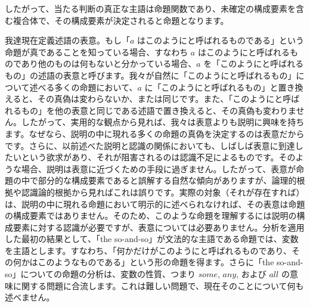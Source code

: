 \documentclass[a4paper,11pt,openany]{ltjsbook}
\begin{document}
したがって、当たる判断の真正な主語は命題関数であり、未確定の構成要素を含む複合体で、その構成要素が決定されると命題となります。

我達現在定義述語の表意。もし「$a$ はこのようにと呼ばれるものである」という命題が真であることを知っている場合、すなわち $a$ はこのようにと呼ばれるものであり他のものは何もないと分かっている場合、$a$ を「このようにと呼ばれるもの」の述語の表意と呼びます。我々が自然に「このようにと呼ばれるもの」について述べる多くの命題において、$a$ に「このようにと呼ばれるもの」と置き換えると、その真偽は変わらないか、または同じです。また、「このようにと呼ばれるもの」を他の表意と同じである述語で置き換えると、その真偽も変わりません。したがって、実用的な観点から見れば、我々は表意よりも説明に興味を持ちます。なぜなら、説明の中に現れる多くの命題の真偽を決定するのは表意だからです。さらに、以前述べた説明と認識の関係においても、しばしば表意に到達したいという欲求があり、それが阻害されるのは認識不足によるものです。そのような場合、説明は表意に近づくための手段に過ぎません。したがって、表意が命題の中で部分的な構成要素であると誤解する自然な傾向がありますが、論理的根拠や認識論的根拠から見ればこれは誤りです。実際の対象（それが存在すれば）は、説明の中に現れる命題において明示的に述べられなければ、その表意は命題の構成要素ではありません。そのため、このような命題を理解するには説明の構成要素に対する認識が必要ですが、表意については必要ありません。分析を適用した最初の結果として、「the so-and-so」が文法的な主語である命題では、変数を主語とします。すなわち、「何かだけがこのようにと呼ばれるものであり、その何かはこのようなものである」という形の命題を得ます。さらに「the so-and-so」についての命題の分析は、変数の性質、つまり $some$, $any$, および $all$ の意味に関する問題に合流します。これは難しい問題で、現在そのことについて何も述べません。
\end{document}
